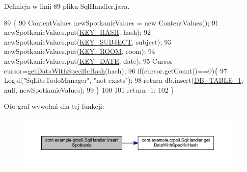 Definicja w linii 89 pliku Sql\+Handler.\+java.


\begin{DoxyCode}
89                                                                                         \{
90             ContentValues newSpotkanieValues = \textcolor{keyword}{new} ContentValues();
91             newSpotkanieValues.put(\hyperlink{classcom_1_1example_1_1qrpoll_1_1_sql_handler_a300c5ab4aec2e6338f2ca3477c86821b}{KEY\_HASH}, hash);
92             newSpotkanieValues.put(\hyperlink{classcom_1_1example_1_1qrpoll_1_1_sql_handler_a5f388a6da5567ff51d36f49536889787}{KEY\_SUBJECT}, subject);
93             newSpotkanieValues.put(\hyperlink{classcom_1_1example_1_1qrpoll_1_1_sql_handler_a78fbe309193399fb67d76eadb67f4b33}{KEY\_ROOM}, room);
94             newSpotkanieValues.put(\hyperlink{classcom_1_1example_1_1qrpoll_1_1_sql_handler_a93e50d5f5a35250e6655f1d8f3192975}{KEY\_DATE}, date);
95             Cursor cursor=\hyperlink{classcom_1_1example_1_1qrpoll_1_1_sql_handler_a2c5fa84b5eb6c9f28e1519c663501e60}{getDataWithSpecificHash}(hash);
96             \textcolor{keywordflow}{if}(cursor.getCount()==0)\{
97                 Log.d(\textcolor{stringliteral}{"SqLiteTodoManager"}, \textcolor{stringliteral}{"not exists"});
98                 \textcolor{keywordflow}{return} db.insert(\hyperlink{classcom_1_1example_1_1qrpoll_1_1_sql_handler_a5858d638c1d649a755b4f18614481a48}{DB\_TABLE\_1}, null, newSpotkanieValues);
99             \}
100             
101             \textcolor{keywordflow}{return} -1;
102         \}
\end{DoxyCode}


Oto graf wywołań dla tej funkcji\+:
\nopagebreak
\begin{figure}[H]
\begin{center}
\leavevmode
\includegraphics[width=350pt]{classcom_1_1example_1_1qrpoll_1_1_sql_handler_a277e4b5d26c99949e13a5a522662f579_cgraph}
\end{center}
\end{figure}


